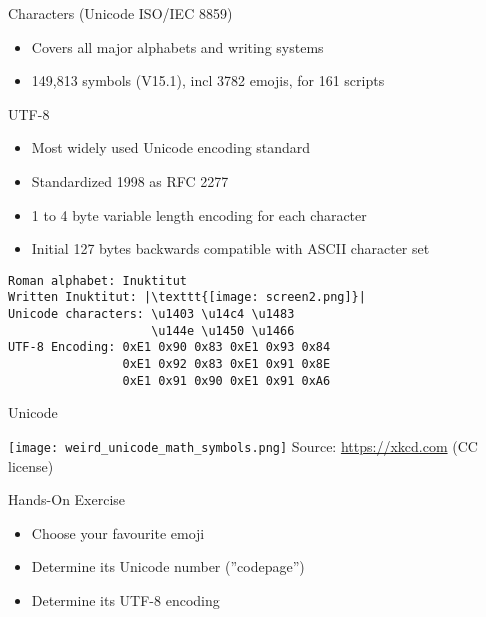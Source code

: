 \documentclass[ignorenonframetext,xcolor=x11names]{beamer}
\begin{document}
\begin{frame}[fragile]{Characters (Unicode ISO/IEC 8859)}
\begin{itemize}
	\item Covers all major alphabets and writing systems
	\item 149,813 symbols (V15.1), incl 3782 emojis, for 161 scripts
\end{itemize}
\begin{block}{UTF-8}
\small
\begin{itemize}
	\item Most widely used Unicode encoding standard
	\item Standardized 1998 as RFC 2277
	\item 1 to 4 byte variable length encoding for each character
	\item Initial 127 bytes backwards compatible with ASCII character set
\end{itemize}
\end{block}

\footnotesize
\begin{verbatim}
Roman alphabet: Inuktitut
Written Inuktitut: |\texttt{[image: screen2.png]}|
Unicode characters: \u1403 \u14c4 \u1483 
                    \u144e \u1450 \u1466
UTF-8 Encoding: 0xE1 0x90 0x83 0xE1 0x93 0x84 
                0xE1 0x92 0x83 0xE1 0x91 0x8E 
                0xE1 0x91 0x90 0xE1 0x91 0xA6
\end{verbatim}

\end{frame}

\begin{frame}{Unicode}
\centering

\texttt{[image: weird\_unicode\_math\_symbols.png]} \scriptsize Source: \url{https://xkcd.com} (CC license)

\end{frame}

\begin{frame}{Hands-On Exercise}
\begin{itemize}
	\item Choose your favourite emoji
	\item Determine its Unicode number (''codepage'')
	\item Determine its UTF-8 encoding
\end{itemize}
\end{frame}
\end{document}
